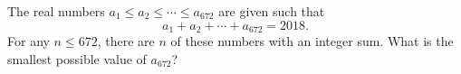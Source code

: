 The real numbers $a_1 \leq a_2 \leq \cdots \leq a_{672}$ are given such that$$a_1 + a_2 + \cdots + a_{672} = 2018.$$For any $n \leq 672$,  there are $n$ of these numbers with an integer sum. What is the smallest possible value of $a_{672}$?
